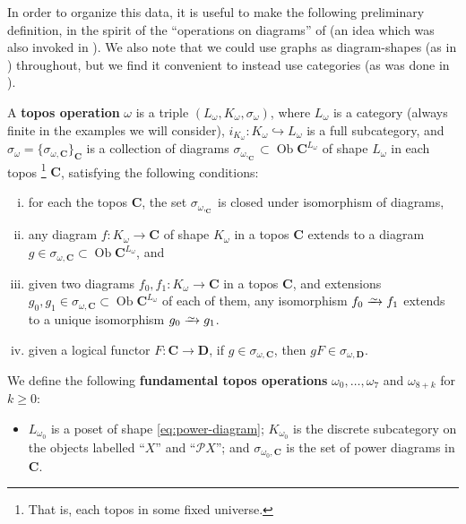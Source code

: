 \documentclass{amsart}
\newcommand\bC{\mathbf{C}}
\newcommand\bD{\mathbf{D}}
\newcommand\defword[1]{{\boldmath \textbf{#1}}}
\newcommand\hto{\hookrightarrow}
\newcommand\Ob{\operatorname{Ob}}
\newcommand\pow{\mathcal{P}}
\newcommand\set[2][]{#1\{ #2 #1\}}
\newcommand\toi{\xrightarrow{\raisebox{-2.5pt}[0pt][0pt]{\ensuremath{\scriptstyle{\sim}}}}}
\theoremstyle{definition}
\theoremstyle{remark}
\theoremstyle{plainwithref}
\begin{document}
In order to organize this data, it is useful to make the following preliminary definition, in the spirit of the ``operations on diagrams'' of \cite[\S1.1]{makkai-ultraproducts} (an idea which was also invoked in \cite[Appendix~B]{helfer-topoi-in-topoi}).
We also note that we could use graphs as diagram-shapes (as in \cite{makkai-ultraproducts,makkai-generalized-sketches-all}) throughout, but we find it convenient to instead use categories (as was done in \cite{helfer-topoi-in-topoi}).

\begin{defn} \label{defn:topos-op}
  A \defword{topos operation} \( \omega \) is a triple \( (L_\omega, K_\omega, \sigma_\omega) \), where \( L_\omega \) is a category (always finite in the examples we will consider), \( i_{K_\omega} \colon K_\omega \hto L_\omega \) is a full subcategory, and \( \sigma_\omega = \set{\sigma_{\omega,\bC}}_\bC \) is a collection of diagrams \( \sigma_{\omega,_\bC} \subset \Ob \bC^{L_\omega} \) of shape \( L_\omega \) in each topos%
  \footnote{
    That is, each topos in some fixed universe.
  }
  \( \bC \), satisfying the following conditions:
  \begin{enumerate}[(i)]
  \item \label{item:topos-op-ext-invt}
    for each the topos \( \bC \), the set \( \sigma_{\omega,_\bC} \) is closed under isomorphism of diagrams,
  \item \label{item:topos-op-ext-ex}
    any diagram \( f \colon K_\omega \to \bC \) of shape \( K_\omega \) in a topos \( \bC \) extends to a diagram \( g \in \sigma_{\omega,\bC} \subset \Ob \bC^{L_\omega} \), and
  \item \label{item:topos-op-ext-uniq}
    given two diagrams \( f_0, f_1 \colon K_\omega \to \bC \) in a topos \( \bC \), and extensions \( g_0, g_1 \in \sigma_{\omega,\bC} \subset \Ob \bC^{L_\omega} \) of each of them, any isomorphism \( f_0 \toi f_1 \) extends to a unique isomorphism \( g_0 \toi g_1 \).
  \item \label{item:topos-op-ext-log-pres}
    given a logical functor \( F \colon \bC \to \bD \), if \( g \in \sigma_{\omega, \bC} \), then \( g F \in \sigma_{\omega, \bD} \).
  \end{enumerate}
  We define the following \defword{fundamental topos operations} \( \omega_0,\ldots,\omega_7 \) and \( \omega_{8+k} \) for \( k \ge 0 \):
  \begin{itemize}
  \item \( L_{\omega_0} \) is a poset of shape \eqref{eq:power-diagram}; \( K_{\omega_0} \) is the discrete subcategory on the objects labelled ``\( X \)'' and ``\( \pow X \)''; and \( \sigma_{\omega_0,\bC} \) is the set of power diagrams in \( \bC \).

\end{itemize}
\end{defn}
\end{document}
